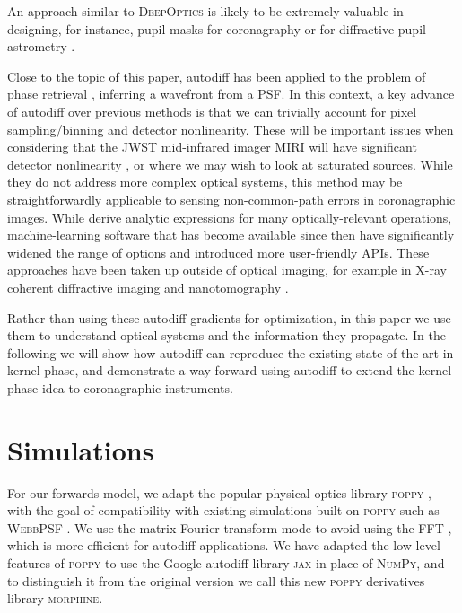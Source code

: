 \documentclass[modern]{aastex63}
\begin{document}
An approach similar to \textsc{DeepOptics} is likely to be extremely valuable in designing, for instance, pupil masks for coronagraphy \citep[e.g.][]{guyon03,carlotti11} or for diffractive-pupil astrometry \citep[e.g.][]{guyon12,tuthill18}. 

Close to the topic of this paper, autodiff has been applied to the problem of phase retrieval \citep{jurling14,paine19}, inferring a wavefront from a PSF. In this context, a key advance of autodiff over previous methods is that we can trivially account for pixel sampling/binning and detector nonlinearity. These will be important issues when considering that the JWST mid-infrared imager MIRI will have significant detector nonlinearity \citep{rieke15}, or where we may wish to look at saturated sources.  While they do not address more complex optical systems, this method may be straightforwardly applicable to sensing non-common-path errors in coronagraphic images. While \citet{jurling14} derive analytic expressions for many optically-relevant operations, machine-learning software that has become available since then have significantly widened the range of options and introduced more user-friendly APIs. These approaches have been taken up outside of optical imaging, for example in X-ray coherent diffractive imaging \citep{kandel19,nashed19} and nanotomography \citep{Dueaay3700}.

Rather than using these autodiff gradients for optimization, in this paper we use them to understand optical systems and the information they propagate.
In the following we will show how autodiff can reproduce the existing state of the art in kernel phase, and demonstrate a way forward using autodiff to extend the kernel phase idea to coronagraphic instruments.

\section{Simulations}
\label{sec:method}

For our forwards model, we adapt the popular physical optics library \textsc{poppy} \citep{poppy}, with the goal of compatibility with existing simulations built on \textsc{poppy} such as \textsc{WebbPSF} \citep{webbpsf}. We use the matrix Fourier transform mode to avoid using the FFT \citep{soummer07}, which is more efficient for autodiff applications. We have adapted the low-level features of \textsc{poppy} to use the Google autodiff library \textsc{jax} \citep{jax} in place of \textsc{NumPy}, and to distinguish it from the original version we call this new \textsc{poppy} derivatives library \textsc{morphine}. %
\end{document}
